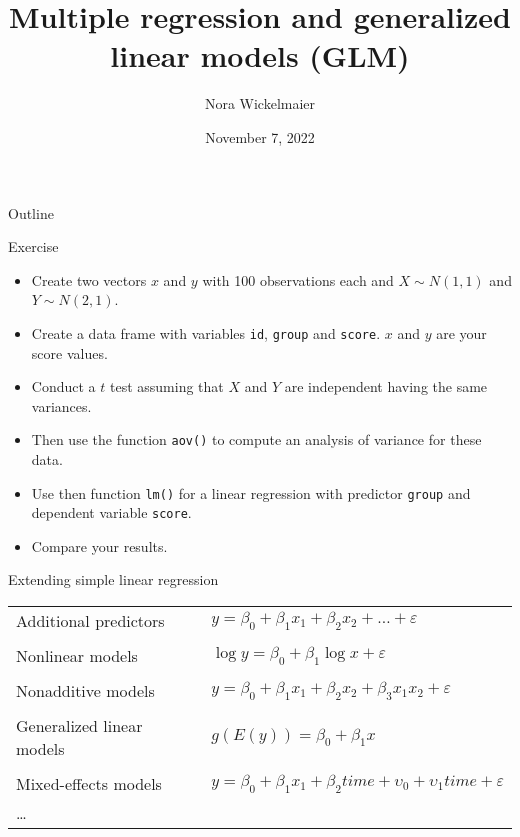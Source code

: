 \documentclass[aspectratio=169]{beamer}
\title{Multiple regression and generalized linear models (GLM)}
\author{Nora Wickelmaier%
}
\date{November 7, 2022}
\begin{document}
\begin{frame}{}
\thispagestyle{empty}
\titlepage
\end{frame}

\begin{frame}{Outline}
\tableofcontents
\end{frame}

\begin{frame}{}
  \begin{block}{Exercise}
    \begin{itemize}
      \item Create two vectors $x$ and $y$ with 100 observations each and
        $X \sim N(1,1)$ and $Y \sim N(2,1)$.
      \item Create a data frame with variables \texttt{id}, \texttt{group}
        and \texttt{score}. $x$ and $y$ are your score values.
      \item Conduct a $t$ test assuming that $X$ and $Y$ are independent 
        having the same variances.
      \item Then use the function \texttt{aov()} to compute an analysis of
        variance for these data.
      \item Use then function \texttt{lm()} for a linear regression with
        predictor \texttt{group} and dependent variable \texttt{score}.
      \item Compare your results.
    \end{itemize}
  \end{block}
\end{frame}

\begin{frame}{Extending simple linear regression}
  \begin{tabular}{ll}
    Additional predictors &
      $y = \beta_0 + \beta_1 x_1 + \beta_2 x_2 + \dots +
      \varepsilon$\\
      & \\
    Nonlinear models &
      $\log y = \beta_0 + \beta_1 \log x + \varepsilon$\\
      & \\
    Nonadditive models &
      $y = \beta_0 + \beta_1 x_1 + \beta_2 x_2 + \beta_3
      x_1 x_2 + \varepsilon$\\
      & \\
    Generalized linear models &
      $g(E(y)) = \beta_0 + \beta_1 x$\\
      & \\
    Mixed-effects models &
      $y = \beta_0 + \beta_1 x_1 + \beta_2 time + 
      \upsilon_0 + \upsilon_1 time + \varepsilon$\\
      \dots & \\
  \end{tabular}
\end{frame}
\end{document}

